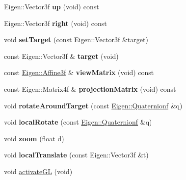 \begin{DoxyCompactItemize}
Eigen\+::\+Vector3f {\bfseries up} (void) const
\item 
\mbox{\label{class_camera_a70fdd29a57d5cf9fe4b1a256f52ee834}} 
Eigen\+::\+Vector3f {\bfseries right} (void) const
\item 
\mbox{\label{class_camera_a098f0009be2dbd2068472154d281ad7a}} 
void {\bfseries set\+Target} (const Eigen\+::\+Vector3f \&target)
\item 
\mbox{\label{class_camera_a265692fc1c8263a6fcd0be857fce27ff}} 
const Eigen\+::\+Vector3f \& {\bfseries target} (void)
\item 
\mbox{\label{class_camera_a733bc9a1e7bd797d36e09ac652f1fea5}} 
const \hyperlink{group___geometry___module_ga17e901de8ff882aea7845c5457db6a4f}{Eigen\+::\+Affine3f} \& {\bfseries view\+Matrix} (void) const
\item 
\mbox{\label{class_camera_a5dfd06d331ed3b5869043de343573643}} 
const Eigen\+::\+Matrix4f \& {\bfseries projection\+Matrix} (void) const
\item 
\mbox{\label{class_camera_af0243aa90deb97bdab8592a634e6a6cd}} 
void {\bfseries rotate\+Around\+Target} (const \hyperlink{group___geometry___module_ga785b13a5a87f9bf55d4eba51ead2dcf0}{Eigen\+::\+Quaternionf} \&q)
\item 
\mbox{\label{class_camera_a33f874756ce3f26b661124a13aa0da2c}} 
void {\bfseries local\+Rotate} (const \hyperlink{group___geometry___module_ga785b13a5a87f9bf55d4eba51ead2dcf0}{Eigen\+::\+Quaternionf} \&q)
\item 
\mbox{\label{class_camera_aa84058b9c5940e96ffd36b7cc3eb3234}} 
void {\bfseries zoom} (float d)
\item 
\mbox{\label{class_camera_ac648e90b5b31e2eb26dc3cb8594dc502}} 
void {\bfseries local\+Translate} (const Eigen\+::\+Vector3f \&t)
\item 
void \hyperlink{class_camera_a4872379b01876af2ffd8d2d871472ed1}{activate\+GL} (void)
\item 
\mbox{\label{class_camera_acb7561ec2c581385a86fa5adacc096ab}} 

\end{DoxyCompactItemize}
